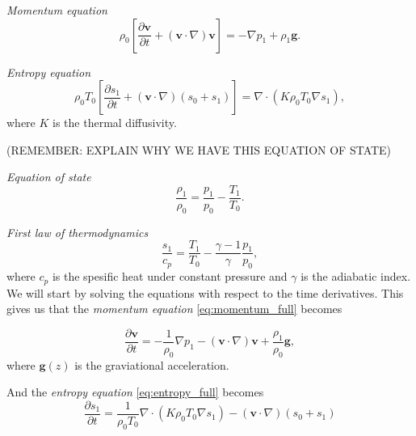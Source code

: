 \documentclass{article}
\begin{document}
\textit{Momentum equation}
\begin{equation}\label{eq:momentum_full}
    \rho_0\left[\frac{\partial\mathbf{v}}{\partial t}+(\mathbf{v}\cdot\nabla)\mathbf{v}\right]=-\nabla p_1 + \rho_1\mathbf{g}.
\end{equation}

\textit{Entropy equation}
\begin{equation}\label{eq:entropy_full}
    \rho_0 T_0 \left[\frac{\partial s_1}{\partial t} + (\mathbf{v}\cdot \nabla)(s_0+s_1) \right]
    = \nabla\cdot(K\rho_0T_0\nabla s_1),
\end{equation}
where $K$ is the thermal diffusivity.

(REMEMBER: EXPLAIN WHY WE HAVE THIS EQUATION OF STATE)

\textit{Equation of state}
\begin{equation}
    \frac{\rho_1}{\rho_0} = \frac{p_1}{p_0} - \frac{T_1}{T_0}.
\end{equation}

\textit{First law of thermodynamics}
\begin{equation}
    \frac{s_1}{c_p} = \frac{T_1}{T_0} - \frac{\gamma-1}{\gamma}\frac{p_1}{p_0},
\end{equation}
where $c_p$ is the spesific heat under constant pressure and $\gamma$ is the adiabatic index. We will start by solving the equations with respect to the time derivatives. This gives us that the \textit{momentum equation} \ref{eq:momentum_full} becomes

\begin{equation}\label{eq:momentum_wrt_t}
    \frac{\partial\mathbf{v}}{\partial t} = -\frac{1}{\rho_0}\nabla p_1 - (\mathbf{v}\cdot\nabla)\mathbf{v} + \frac{\rho_1}{\rho_0}\mathbf{g},
\end{equation}
where $\mathbf{g}(z)$ is the graviational acceleration.

And the \textit{entropy equation} \ref{eq:entropy_full} becomes
\begin{equation}\label{eq:entropy_wrt_t}
    \frac{\partial s_1}{\partial t} = \frac{1}{\rho_0 T_0} \nabla\cdot(K\rho_0 T_0 \nabla s_1) - (\mathbf{v}\cdot\nabla)(s_0+s_1)
\end{equation}
\end{document}
